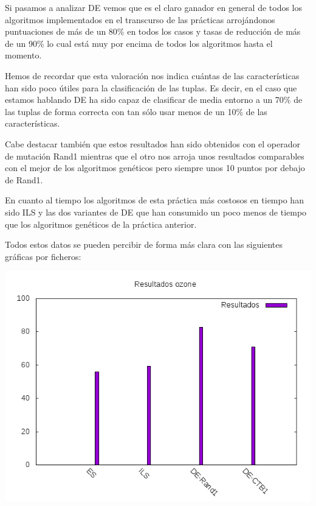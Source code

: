 \documentclass[12pt,a4paper]{article}
\begin{document}
	Si pasamos a analizar DE vemos que es el claro ganador en general de todos los algoritmos implementados en el transcurso de las prácticas arrojándonos puntuaciones de más de un 80\% en todos los casos y tasas de reducción de más de un 90\% lo cual está muy por encima de todos los algoritmos hasta el momento.
	
	Hemos de recordar que esta valoración nos indica cuántas de las características han sido poco útiles para la clasificación de las tuplas. Es decir, en el caso que estamos hablando DE ha sido capaz de clasificar de media entorno a un 70\% de las tuplas de forma correcta con tan sólo usar menos de un 10\% de las características.
	
	Cabe destacar también que estos resultados han sido obtenidos con el operador de mutación Rand1 mientras que el otro nos arroja unos resultados comparables con el mejor de los algoritmos genéticos pero siempre unos 10 puntos por debajo de Rand1.
	
	En cuanto al tiempo los algoritmos de esta práctica más costosos en tiempo han sido ILS y las dos variantes de DE que han consumido un poco menos de tiempo que los algoritmos genéticos de la práctica anterior.
	
	Todos estos datos se pueden percibir de forma más clara con las siguientes gráficas por ficheros:
	
	\includegraphics[scale=0.8]{./Imagenes/Resultados/ozone.png}
	
\end{document}

